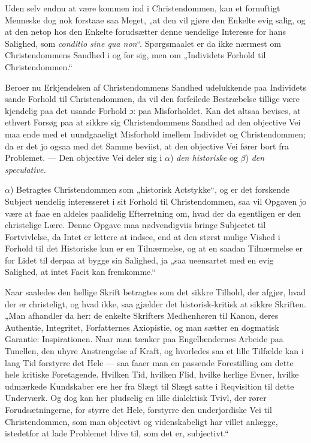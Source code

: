 Uden selv endnu at være kommen ind i Christendommen, kan et
fornuftigt Menneske dog nok forstaae saa Meget, „at den vil gjøre
den Enkelte evig salig, og at den netop hos den Enkelte
forudsætter denne uendelige Interesse for hans Salighed, som
\textit{conditio sine qua non}“. Spørgsmaalet er da ikke nærmest
om Christendommens Sandhed i og for sig, men om „Individets
Forhold til Christendommen.“

Beroer nu Erkjendelsen af Christendommens Sandhed udelukkende paa
Individets sande Forhold til Christendommen, da vil den forfeilede
Bestræbelse tillige være kjendelig paa det usande Forhold ɔ: paa
Misforholdet. Kan det altsaa bevises, at ethvert Forsøg paa at
sikkre sig Christendommens Sandhed ad den objective Vei maa ende
med et uundgaaeligt Misforhold imellem Individet og
Christendommen; da er det jo ogsaa med det Samme beviist, at den
objective Vei fører bort fra
 Problemet. --- Den objective Vei deler sig i $\alpha$) \emph{den
historiske} og $\beta$) \emph{den speculative.}

$\alpha$) Betragtes Christendommen som „historisk Actstykke“, og
er det forskende Subject uendelig interesseret i sit Forhold til
Christendommen, saa vil Opgaven jo være at faae en aldeles
paalidelig Efterretning om, hvad der da egentligen er den
christelige Lære. Denne Opgave maa nødvendigviis bringe Subjectet
til Fortvivlelse, da Intet er lettere at indsee, end at den størst
mulige Vished i Forhold til det Historiske kun er en Tilnærmelse,
og at en saadan Tilnærmelse er for Lidet til derpaa at bygge sin
Salighed, ja „saa ueensartet med en evig Salighed, at intet Facit
kan fremkomme.“

Naar saaledes den hellige Skrift betragtes som det sikkre Tilhold,
der afgjør, hvad der er christeligt, og hvad ikke, saa gjælder det
historisk-kritisk at sikkre Skriften. „Man afhandler da her: de
enkelte Skrifters Medhenhøren til Kanon, deres Authentie,
Integritet, Forfatternes Axiopistie, og man sætter en dogmatisk
Garantie: Inspirationen. Naar man tænker paa Engellændernes
Arbeide paa Tunellen, den uhyre Anstrengelse af Kraft, og
hvorledes saa et lille Tilfælde kan i lang Tid forstyrre det Hele
--- saa faaer man en passende Forestilling om dette hele kritiske
Foretagende. Hvilken Tid, hvilken Flid, hvilke herlige Evner,
hvilke udmærkede Kundskaber ere her fra Slægt til Slægt satte i
Reqvisition til dette Underværk. Og dog kan her pludselig en lille
dialektisk Tvivl, der rører Forudsætningerne, for%
styrre det Hele, forstyrre den underjordiske Vei til
Christendommen, som man objectivt og videnskabeligt har villet
anlægge, istedetfor at lade Problemet blive til, som det er,
subjectivt.“

